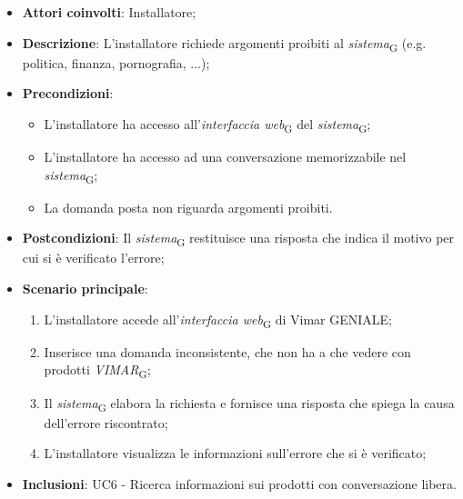 \begin{itemize}
    \item \textbf{Attori coinvolti}: Installatore;
    \item \textbf{Descrizione}: L’installatore richiede argomenti proibiti al \textit{sistema}\textsubscript{G} (e.g. politica, finanza, pornografia, ...);
    \item \textbf{Precondizioni}: 
        \begin{itemize}
            \item L’installatore ha accesso all’\textit{interfaccia web}\textsubscript{G} del \textit{sistema}\textsubscript{G};
            \item L’installatore ha accesso ad una conversazione memorizzabile nel \textit{sistema}\textsubscript{G};
            \item La domanda posta non riguarda argomenti proibiti.
        \end{itemize}
    \item \textbf{Postcondizioni}: Il \textit{sistema}\textsubscript{G} restituisce una risposta che indica il motivo per cui si è verificato l’errore;
    \item \textbf{Scenario principale}:
    \begin{enumerate}
    \item L’installatore accede all’\textit{interfaccia web}\textsubscript{G} di Vimar GENIALE;
    \item Inserisce una domanda inconsistente, che non ha a che vedere con prodotti \textit{VIMAR}\textsubscript{G};
    \item Il \textit{sistema}\textsubscript{G} elabora la richiesta e fornisce una risposta che spiega la causa dell'errore riscontrato;
    \item L’installatore visualizza le informazioni sull’errore che si è verificato;
    \end{enumerate}
     \item \textbf{Inclusioni}: UC6 - Ricerca informazioni sui prodotti con conversazione libera.
\end{itemize}

